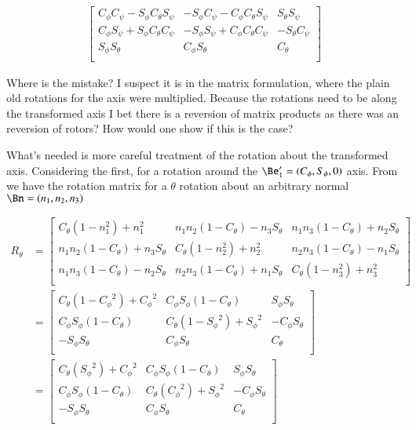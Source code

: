 \documentclass{article}
\begin{document}
\begin{align*}
\begin{bmatrix}
C_\phi C_\psi - S_\phi C_\theta S_\psi & -S_\phi C_\psi - C_\phi C_\theta S_\psi & S_\theta S_\psi \\
C_\phi S_\psi + S_\phi C_\theta C_\psi & -S_\phi S_\psi + C_\phi C_\theta C_\psi & -S_\theta C_\psi \\
S_\phi S_\theta                        &                  C_\phi S_\theta        & C_\theta \\
\end{bmatrix}
\end{align*}

Where is the mistake?  I suspect it is in the matrix formulation, where the plain old rotations for the axis were multiplied.  Because the rotations need to be along the transformed
axis I bet there is a reversion of matrix products as there was an reversion of rotors?  How would one show if this is the case?

What's needed is more careful treatment of the rotation about the transformed axis.  Considering the first, for a rotation
around the $\Be_1' = (C_\phi, S_\phi, 0)$ axis.  From \cite{PJRotor} we have the rotation matrix for a $\theta$ rotation about
an arbitrary normal $\Bn = (n_1, n_2, n_3)$

\begin{align*}
R_\theta
&=
\begin{bmatrix}
C_\theta(1 -n_1^2) + n_1^2 & n_1 n_2 (1-C_\theta) - n_3 S_\theta & n_1 n_3 (1-C_\theta) + n_2 S_\theta \\
n_1 n_2 (1-C_\theta) + n_3 S_\theta & C_\theta(1 -n_2^2) + n_2^2 & n_2 n_3 (1-C_\theta) - n_1 S_\theta \\
n_1 n_3 (1-C_\theta) - n_2 S_\theta & n_2 n_3 (1-C_\theta) + n_1 S_\theta & C_\theta(1 -n_3^2) + n_3^2 \\
\end{bmatrix} \\
&=
\begin{bmatrix}
C_\theta(1 -{C_\phi}^2) + {C_\phi}^2 & {C_\phi} {S_\phi} (1-C_\theta) & {S_\phi} S_\theta \\
{C_\phi} {S_\phi} (1-C_\theta) & C_\theta(1 -{S_\phi}^2) + {S_\phi}^2 & - {C_\phi} S_\theta \\
- {S_\phi} S_\theta & {C_\phi} S_\theta & C_\theta \\
\end{bmatrix} \\
&=
\begin{bmatrix}
C_\theta({S_\phi}^2) + {C_\phi}^2 & {C_\phi} {S_\phi} (1-C_\theta) & {S_\phi} S_\theta \\
{C_\phi} {S_\phi} (1-C_\theta) & C_\theta({C_\phi}^2) + {S_\phi}^2 & - {C_\phi} S_\theta \\
- {S_\phi} S_\theta & {C_\phi} S_\theta & C_\theta \\
\end{bmatrix} \\
\end{align*}
\end{document}
